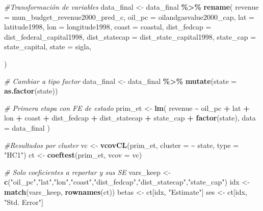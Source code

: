 \documentclass[
]{article}
\newenvironment{Shaded}{\begin{snugshade}}{\end{snugshade}}
\newcommand{\AttributeTok}[1]{\textcolor[rgb]{0.13,0.29,0.53}{#1}}
\newcommand{\CommentTok}[1]{\textcolor[rgb]{0.56,0.35,0.01}{\textit{#1}}}
\newcommand{\FunctionTok}[1]{\textcolor[rgb]{0.13,0.29,0.53}{\textbf{#1}}}
\newcommand{\NormalTok}[1]{#1}
\newcommand{\OtherTok}[1]{\textcolor[rgb]{0.56,0.35,0.01}{#1}}
\newcommand{\SpecialCharTok}[1]{\textcolor[rgb]{0.81,0.36,0.00}{\textbf{#1}}}
\newcommand{\StringTok}[1]{\textcolor[rgb]{0.31,0.60,0.02}{#1}}
\begin{document}
\begin{Shaded}
\begin{Highlighting}[]
\CommentTok{\#Transformación de variables }
\NormalTok{data\_final }\OtherTok{\textless{}{-}}\NormalTok{ data\_final }\SpecialCharTok{\%\textgreater{}\%}
    \FunctionTok{rename}\NormalTok{(}
    \AttributeTok{revenue     =}\NormalTok{ mun\_budget\_revenue2000\_pred\_c,}
    \AttributeTok{oil\_pc      =}\NormalTok{ oilandgasvalue2000\_cap,}
    \AttributeTok{lat         =}\NormalTok{ latitude1998,}
    \AttributeTok{lon         =}\NormalTok{ longitude1998,}
    \AttributeTok{coast       =}\NormalTok{ coastal,}
    \AttributeTok{dist\_fedcap =}\NormalTok{ dist\_federal\_capital1998,}
    \AttributeTok{dist\_statecap =}\NormalTok{ dist\_state\_capital1998,}
    \AttributeTok{state\_cap   =}\NormalTok{ state\_capital,}
    \AttributeTok{state    =}\NormalTok{ sigla, }
    
\NormalTok{  )}
  
  
\CommentTok{\# Cambiar a tipo factor }
\NormalTok{data\_final }\OtherTok{\textless{}{-}}\NormalTok{ data\_final }\SpecialCharTok{\%\textgreater{}\%} \FunctionTok{mutate}\NormalTok{(}\AttributeTok{state =} \FunctionTok{as.factor}\NormalTok{(state))}

\CommentTok{\# Primera etapa con FE de estado }
\NormalTok{prim\_et }\OtherTok{\textless{}{-}} \FunctionTok{lm}\NormalTok{(}
\NormalTok{  revenue }\SpecialCharTok{\textasciitilde{}}\NormalTok{ oil\_pc }\SpecialCharTok{+}\NormalTok{ lat }\SpecialCharTok{+}\NormalTok{ lon }\SpecialCharTok{+}\NormalTok{ coast }\SpecialCharTok{+}\NormalTok{ dist\_fedcap }\SpecialCharTok{+}\NormalTok{ dist\_statecap }\SpecialCharTok{+}\NormalTok{ state\_cap }\SpecialCharTok{+} \FunctionTok{factor}\NormalTok{(state),}
  \AttributeTok{data =}\NormalTok{ data\_final}
\NormalTok{)}

\CommentTok{\#Resultados por cluster}
\NormalTok{vc }\OtherTok{\textless{}{-}} \FunctionTok{vcovCL}\NormalTok{(prim\_et, }\AttributeTok{cluster =} \SpecialCharTok{\textasciitilde{}}\NormalTok{ state, }\AttributeTok{type =} \StringTok{"HC1"}\NormalTok{)}
\NormalTok{ct }\OtherTok{\textless{}{-}} \FunctionTok{coeftest}\NormalTok{(prim\_et, }\AttributeTok{vcov =}\NormalTok{ vc)}

\CommentTok{\# Solo coeficientes a reportar y sus SE}
\NormalTok{vars\_keep }\OtherTok{\textless{}{-}} \FunctionTok{c}\NormalTok{(}\StringTok{"oil\_pc"}\NormalTok{,}\StringTok{"lat"}\NormalTok{,}\StringTok{"lon"}\NormalTok{,}\StringTok{"coast"}\NormalTok{,}\StringTok{"dist\_fedcap"}\NormalTok{,}\StringTok{"dist\_statecap"}\NormalTok{,}\StringTok{"state\_cap"}\NormalTok{)}
\NormalTok{idx }\OtherTok{\textless{}{-}} \FunctionTok{match}\NormalTok{(vars\_keep, }\FunctionTok{rownames}\NormalTok{(ct))}
\NormalTok{betas }\OtherTok{\textless{}{-}}\NormalTok{ ct[idx, }\StringTok{"Estimate"}\NormalTok{]}
\NormalTok{ses   }\OtherTok{\textless{}{-}}\NormalTok{ ct[idx, }\StringTok{"Std. Error"}\NormalTok{]}


\end{Highlighting}
\end{Shaded}
\end{document}
